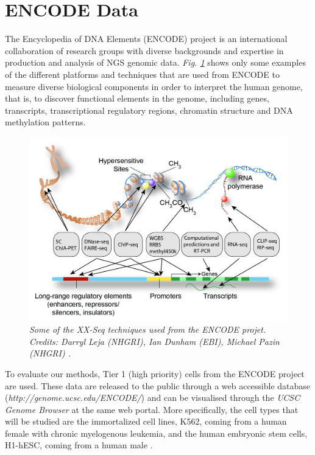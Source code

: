 \section{ENCODE Data} \label{encode-data-sect}
The Encyclopedia of DNA Elements (ENCODE) project \citep{Dunham2012} is an international collaboration of research groups with diverse backgrounds and expertise in production and analysis of NGS genomic data. \emph{Fig. \ref{encode-seq-pic}} shows only some examples of the different platforms and techniques that are used from ENCODE to measure diverse biological components in order to interpret the human genome, that is, to discover functional elements in the genome, including genes, transcripts, transcriptional regulatory regions, chromatin structure and DNA methylation patterns.

\begin{figure}[!ht]
\begin{center}
 \includegraphics[scale = 0.24]{images/encode-seq.png}
\caption{\emph{Some of the XX-Seq techniques used from the ENCODE projet. Credits: Darryl Leja (NHGRI), Ian Dunham (EBI), Michael Pazin (NHGRI) \citep{Dunham2012}.}}
\label{encode-seq-pic}
\end{center}
\end{figure} 

To evaluate our methods, Tier 1 (\ie high priority) cells from the ENCODE project are used. These data are released to the public through a web accessible database (\emph{http://genome.ucsc.edu/ENCODE/}) and can be visualised through the \emph{UCSC Genome Browser} at the same web portal. More specifically, the cell types that will be studied are the immortalized cell lines, K562, coming from a human female with chronic myelogenous leukemia, and the human embryonic stem cells, H1-hESC, coming from a human male \citep{Dunham2012}.

